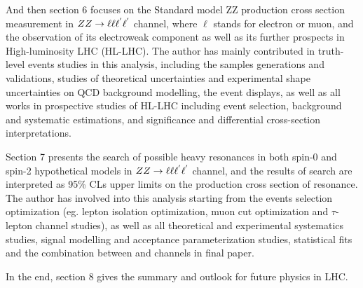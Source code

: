 And then section 6 focuses on the Standard model ZZ production cross section measurement in $ZZ \rightarrow \ell\ell\ell^{'}\ell^{'}$ channel, where $\mathrm{\ell}$ stands for electron or muon, 
and the observation of its electroweak component as well as its further prospects in High-luminosity LHC (HL-LHC). 
The author has mainly contributed in truth-level events studies in this analysis, including the \MGMCatNLO samples generations and validations, studies of theoretical uncertainties and experimental shape uncertainties on QCD \qqZZ background modelling, the event displays,
as well as all works in prospective studies of HL-LHC including event selection, background and systematic estimations, and significance and differential cross-section interpretations.

Section 7 presents the search of possible heavy resonances in both spin-0 and spin-2 hypothetical models in $ZZ \rightarrow \ell\ell\ell^{'}\ell^{'}$ channel, 
and the results of search are interpreted as 95\% CLs upper limits on the production cross section of resonance. 
The author has involved into this analysis starting from the events selection optimization (eg. lepton isolation optimization, muon \pt cut optimization and $\tau$-lepton channel studies), 
as well as all theoretical and experimental systematics studies, signal modelling and acceptance parameterization studies, statistical fits and the combination between \llll and \llvv channels in final paper. 

In the end, section 8 gives the summary and outlook for future physics in LHC.
